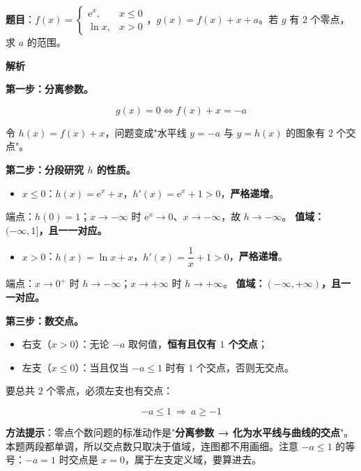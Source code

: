 \par\medskip


\textbf{题目}：$f(x)=\begin{cases}\mathrm e^{x},&x\le0\\ \ln x,&x>0\end{cases}$，$g(x)=f(x)+x+a$。若 $g$ 有 $2$ 个零点，求 $a$ 的范围。

\textbf{解析}

\textbf{第一步：分离参数。}

\[g(x)=0\iff f(x)+x=-a\]

令 $h(x)=f(x)+x$，问题变成"水平线 $y=-a$ 与 $y=h(x)$ 的图象有 $2$ 个交点"。

\textbf{第二步：分段研究 $h$ 的性质。}

\begin{itemize}
\item $x\le0$：$h(x)=\mathrm e^{x}+x$，$h'(x)=\mathrm e^{x}+1>0$，\textbf{严格递增}。
\end{itemize}
  端点：$h(0)=1$；$x\to-\infty$ 时 $\mathrm e^{x}\to0$、$x\to-\infty$，故 $h\to-\infty$。
  \textbf{值域：$(-\infty,1]$，且一一对应。}

\begin{itemize}
\item $x>0$：$h(x)=\ln x+x$，$h'(x)=\dfrac1x+1>0$，\textbf{严格递增}。
\end{itemize}
  端点：$x\to0^{+}$ 时 $h\to-\infty$；$x\to+\infty$ 时 $h\to+\infty$。
  \textbf{值域：$(-\infty,+\infty)$，且一一对应。}

\textbf{第三步：数交点。}

\begin{itemize}
\item 右支（$x>0$）：无论 $-a$ 取何值，\textbf{恒有且仅有 $1$ 个交点}；
\item 左支（$x\le0$）：当且仅当 $-a\le1$ 时有 $1$ 个交点，否则无交点。
\end{itemize}

要总共 $2$ 个零点，必须左支也有交点：

\[-a\le1\ \Longrightarrow\ a\ge-1\]

\gkanswer{答案：C（$[-1,+\infty)$）}

\begin{gktip}
\textbf{方法提示}：零点个数问题的标准动作是"\textbf{分离参数 → 化为水平线与曲线的交点}"。本题两段都单调，所以交点数只取决于值域，连图都不用画细。注意 $-a\le1$ 的等号：$-a=1$ 时交点是 $x=0$，属于左支定义域，要算进去。
\end{gktip}

